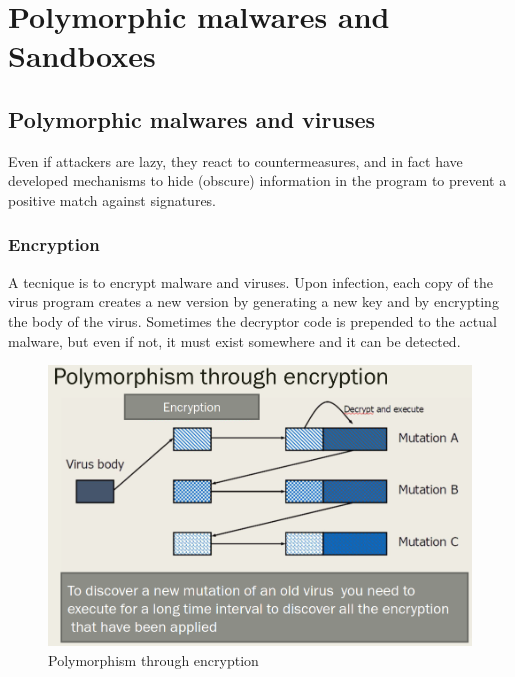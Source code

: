 \chapter{Polymorphic malwares and Sandboxes}

\section{Polymorphic malwares and viruses}

Even if attackers are lazy,
they react to countermeasures,
and in fact have developed mechanisms to hide (obscure) information
in the program to prevent a positive match against signatures.

\subsection{Encryption}
A tecnique is to encrypt malware and viruses.
Upon infection, each copy of the virus program creates a
new version by generating a new key and by encrypting the
body of the virus.
Sometimes the decryptor code is prepended to the actual malware, 
but even if not, it must exist somewhere and it can be
detected.

\begin{figure}[htbp]
   \centering
   \includegraphics{images/polymorphism_encryption.png}
   \caption{Polymorphism through encryption}
   \label{fig:polymorphism_encryption}
\end{figure}

